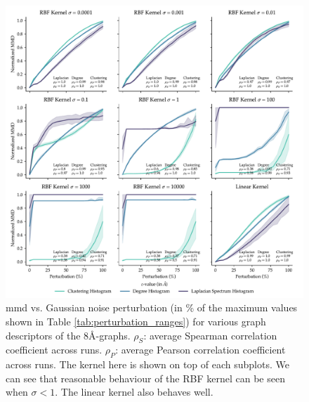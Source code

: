 \begin{figure}[!htbp]
  \centering
  \includegraphics[width=\textwidth]{./figures/results/res_1_2.pdf}
  \caption[Influence of kernel parameters on \acrshort{mmd} behaviour.]{\acrshort{mmd} vs. Gaussian
    noise perturbation (in \% of the maximum values shown
    in Table \ref{tab:perturbation_ranges}) for various graph descriptors of the
    8\si{\angstrom}-graphs. $\rho_{S}$: average Spearman correlation coefficient
    across runs. $\rho_{P}$: average Pearson correlation coefficient across runs.
    The kernel here is shown on top of each subplots. We can see that reasonable
    behaviour of the RBF kernel can be seen when $\sigma<1$. The linear kernel also
    behaves well.}
  \label{fig:mmd_effect_kernel}
\end{figure}

